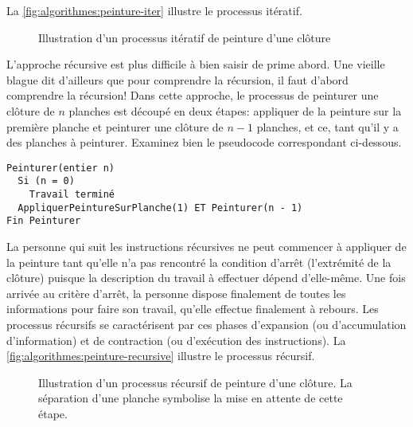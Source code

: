La \autoref{fig:algorithmes:peinture-iter} illustre le processus itératif.

\begin{figure}
  \centering
  \setlength{\unitlength}{0.99mm}
  
  
  \caption{Illustration d'un processus itératif de peinture d'une
    clôture}
  \label{fig:algorithmes:peinture-iter}
\end{figure}

L'approche récursive est plus difficile à bien saisir de prime abord.
Une vieille blague dit d'ailleurs que pour comprendre la récursion, il
faut d'abord comprendre la récursion! Dans cette approche, le
processus de peinturer une clôture de $n$ planches est découpé en deux
étapes: appliquer de la peinture sur la première planche et peinturer
une clôture de $n - 1$ planches, et ce, tant qu'il y a des planches à
peinturer. Examinez bien le pseudocode correspondant ci-dessous.
\begin{Schunk}
\begin{Verbatim}
Peinturer(entier n)
  Si (n = 0)
    Travail terminé
  AppliquerPeintureSurPlanche(1) ET Peinturer(n - 1)
Fin Peinturer
\end{Verbatim}
\end{Schunk}

La personne qui suit les instructions récursives ne peut commencer à
appliquer de la peinture tant qu'elle n'a pas rencontré la condition
d'arrêt (l'extrémité de la clôture) puisque la description du travail
à effectuer dépend d'elle-même. Une fois arrivée au critère d'arrêt,
la personne dispose finalement de toutes les informations pour faire
son travail, qu'elle effectue finalement à rebours. Les processus
récursifs se caractérisent par ces phases d'expansion
(ou d'accumulation d'information) et de contraction
(ou d'exécution des instructions). La
\autoref{fig:algorithmes:peinture-recursive} illustre le processus
récursif.

\begin{figure}
  \centering
  \setlength{\unitlength}{0.99mm}
  
  
  \caption[Illustration d'un processus récursif de peinture d'une
  clôture]{Illustration d'un processus récursif de peinture d'une
    clôture. La séparation d'une planche symbolise la mise en attente
    de cette étape.}
  \label{fig:algorithmes:peinture-recursive}
\end{figure}

